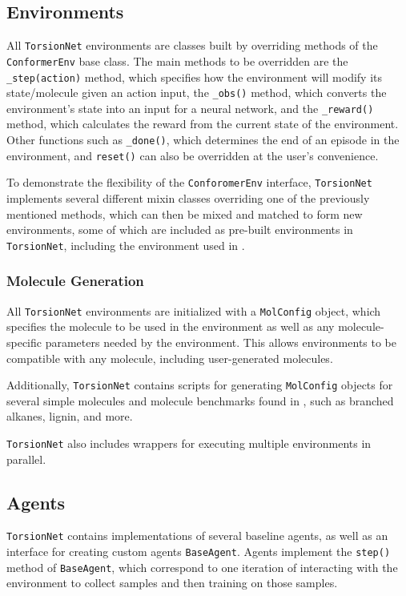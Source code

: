 \documentclass[twoside,11pt]{article}
\newcommand{\code}[1]{\texttt{#1}}
\begin{document}
\subsection{Environments}
All \code{TorsionNet} environments are classes built by overriding methods of the \code{ConformerEnv} base class. The main methods to be overridden are the \code{\_step(action)} method, which specifies how the environment will modify its state/molecule given an action input, the \code{\_obs()} method, which converts the environment's state into an input for a neural network, and the \code{\_reward()} method, which calculates the reward from the current state of the environment. Other functions such as \code{\_done()}, which determines the end of an episode in the environment, and \code{reset()} can also be overridden at the user's convenience.

To demonstrate the flexibility of the \code{ConforomerEnv} interface, \code{TorsionNet} implements several different mixin classes overriding one of the previously mentioned methods, which can then be mixed and matched to form new environments, some of which are included as pre-built environments in \code{TorsionNet}, including the environment used in \citet{gogineni2020torsionnet}.

  \subsubsection{Molecule Generation}
  All \code{TorsionNet} environments are initialized with a \code{MolConfig} object, which specifies the molecule to be used in the environment as well as any molecule-specific parameters needed by the environment. This allows environments to be compatible with any molecule, including user-generated molecules.

  Additionally, \code{TorsionNet} contains scripts for generating \code{MolConfig} objects for several simple molecules and molecule benchmarks found in \citet{gogineni2020torsionnet}, such as branched alkanes, lignin, and more.

\code{TorsionNet} also includes wrappers for executing multiple environments in parallel. 

\subsection{Agents}
  \code{TorsionNet} contains implementations of several baseline agents, as well as an interface for creating custom agents \code{BaseAgent}. Agents implement the \code{step()} method of \code{BaseAgent}, which correspond to one iteration of interacting with the environment to collect samples and then training on those samples.
\end{document}
